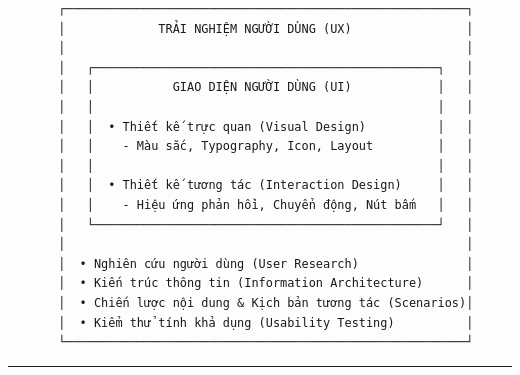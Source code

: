 \documentclass[11pt,a4paper,oneside]{report}
\begin{document}
\begin{verbatim}
       ┌────────────────────────────────────────────────────────┐
       │             TRẢI NGHIỆM NGƯỜI DÙNG (UX)                │
       │                                                        │
       │   ┌────────────────────────────────────────────────┐   │
       │   │           GIAO DIỆN NGƯỜI DÙNG (UI)            │   │
       │   │                                                │   │
       │   │  • Thiết kế trực quan (Visual Design)          │   │
       │   │    - Màu sắc, Typography, Icon, Layout         │   │
       │   │                                                │   │
       │   │  • Thiết kế tương tác (Interaction Design)     │   │
       │   │    - Hiệu ứng phản hồi, Chuyển động, Nút bấm   │   │
       │   └────────────────────────────────────────────────┘   │
       │                                                        │
       │  • Nghiên cứu người dùng (User Research)               │
       │  • Kiến trúc thông tin (Information Architecture)      │
       │  • Chiến lược nội dung & Kịch bản tương tác (Scenarios)│
       │  • Kiểm thử tính khả dụng (Usability Testing)          │
       └────────────────────────────────────────────────────────┘
\end{verbatim}

\bigskip\hrule\bigskip
\end{document}
